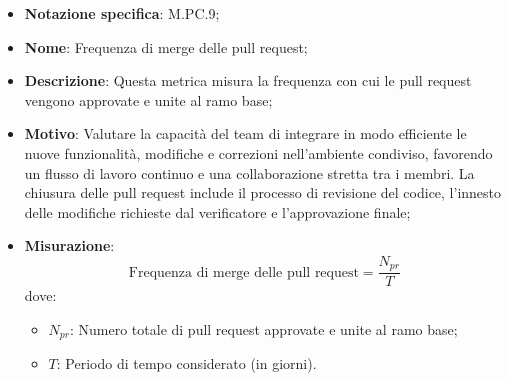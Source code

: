 \begin{itemize}
    \item \textbf{Notazione specifica}: M.PC.9;
    \item \textbf{Nome}: Frequenza di merge delle pull request;
    \item \textbf{Descrizione}: Questa metrica misura la frequenza con cui le pull request vengono approvate e unite al ramo base;
    \item \textbf{Motivo}: Valutare la capacità del team di integrare in modo efficiente le nuove funzionalità, modifiche e correzioni nell’ambiente condiviso, favorendo un flusso di lavoro continuo e una collaborazione  stretta tra i membri. La chiusura delle pull request include il processo di revisione del codice, l’innesto delle modifiche richieste dal verificatore e l’approvazione finale;
    \item \textbf{Misurazione}:
    \[
        \text{Frequenza di merge delle pull request} =\frac{N_{pr}}{T} 
    \]
    dove:
    \begin{itemize}
        \item $N_{pr}$: Numero totale di pull request approvate e unite al ramo base;
        \item $T$: Periodo di tempo considerato (in giorni).
    \end{itemize}
\end{itemize}

